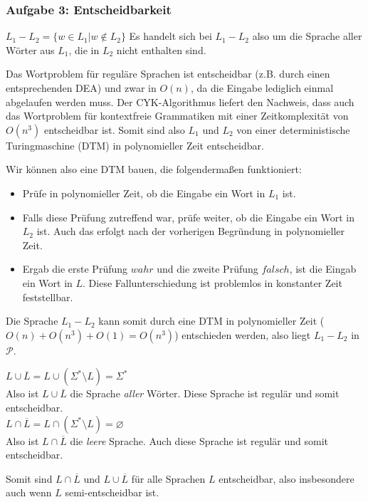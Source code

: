\subsubsection{Aufgabe 3: Entscheidbarkeit}
\begin{teile}
	\item
	$L_1 - L_2 = \{ w \in L_1 \vert w \notin L_2\}$ Es handelt sich bei $L_1 - L_2$ also um die Sprache aller Wörter aus $L_1$, die in $L_2$ nicht enthalten sind.

	Das Wortproblem für reguläre Sprachen ist entscheidbar (z.B. durch einen entsprechenden DEA) und zwar in $O(n)$, da die Eingabe lediglich einmal abgelaufen werden muss. Der CYK-Algorithmus liefert den Nachweis, dass auch das Wortproblem für kontextfreie Grammatiken mit einer Zeitkomplexität von $O(n^3)$ entscheidbar ist. Somit sind also $L_1$ und $L_2$ von einer deterministische Turingmaschine (DTM) in polynomieller Zeit entscheidbar.
	
	Wir können also eine DTM bauen, die folgendermaßen funktioniert:
	\begin{itemize}
		\item
		Prüfe in polynomieller Zeit, ob die Eingabe ein Wort in $L_1$ ist.
		\item 
		Falls diese Prüfung zutreffend war, prüfe weiter, ob die Eingabe ein Wort in $L_2$ ist. Auch das erfolgt nach der vorherigen Begründung in polynomieller Zeit.
		\item
		Ergab die erste Prüfung $wahr$ und die zweite Prüfung $falsch$, ist die Eingab ein Wort in $L$. Diese Fallunterschiedung ist problemlos in konstanter Zeit feststellbar.
	\end{itemize}
	
	Die Sprache $L_1 - L_2$ kann somit durch eine DTM in polynomieller Zeit ($O(n)+O(n^3)+O(1)=O(n^3)$) entschieden werden, also liegt $L_1 - L_2$ in $\mathcal{P}$.
	
	\item
	$L \cup \overline{L} = L \cup (\Sigma^*\setminus L) = \Sigma^*$\\
	Also ist $L \cup \overline{L}$ die Sprache \textit{aller} Wörter. Diese Sprache ist regulär und somit entscheidbar.\\
	$L \cap \overline{L} = L \cap (\Sigma^*\setminus L) = \varnothing $\\
	Also ist $L \cap \overline{L}$ die \textit{leere} Sprache. Auch diese Sprache ist regulär und somit entscheidbar.

	Somit sind $L \cap \overline{L}$ und $L \cup \overline{L}$ für alle Sprachen $L$ entscheidbar, also insbesondere auch wenn $L$ semi-entscheidbar ist.


\end{teile}
